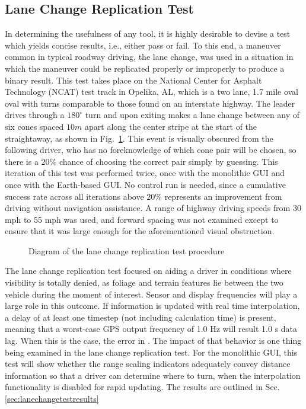 \subsection{Lane Change Replication Test} \label{sec:lanechangetest}
In determining the usefulness of any tool, it is highly desirable to devise a test which yields concise results, i.e., either pass or fail. To this end, a maneuver common in typical roadway driving, the lane change, was used in a situation in which the maneuver could be replicated properly or improperly to produce a binary result. This test takes place on the National Center for Asphalt Technology (NCAT) test track in Opelika, AL, which is a two lane, 1.7 mile oval oval with turns comparable to those found on an interstate highway. The leader drives through a $180^\circ$ turn and upon exiting makes a lane change between any of six cones spaced $10m$ apart along the center stripe at the start of the straightaway, as shown in Fig.~\ref{fig:lanechangediagram}. This event is visually obscured from the following driver, who has no foreknowledge of which cone pair will be chosen, so there is a $20\%$ chance of choosing the correct pair simply by guessing. This iteration of this test was performed twice, once with the monolithic GUI and once with the Earth-based GUI. No control run is needed, since a cumulative success rate across all iterations above $20\%$ represents an improvement from driving without navigation assistance. A range of highway driving speeds from 30 mph to 55 mph was used, and forward spacing was not examined except to ensure that it was large enough for the aforementioned visual obstruction.

\begin{figure}[ht] \centering
    
    \caption{Diagram of the lane change replication test procedure} \label{fig:lanechangediagram}
\end{figure}

The lane change replication test focused on aiding a driver in conditions where visibility is totally denied, as foliage and terrain features lie between the two vehicle during the moment of interest. Sensor and display frequencies will play a large role in this outcome. If information is updated with real time interpolation, a delay of at least one timestep (not including calculation time) is present, meaning that a worst-case GPS output frequency of 1.0 Hz will result 1.0 s data lag. When this is the case, the error in . The impact of that behavior is one thing being examined in the lane change replication test. For the monolithic GUI, this test will show whether the range scaling indicators adequately convey distance information so that a driver can determine where to turn, when the interpolation functionality is disabled for rapid updating. The results are outlined in Sec. \ref{sec:lanechangetestresults}

